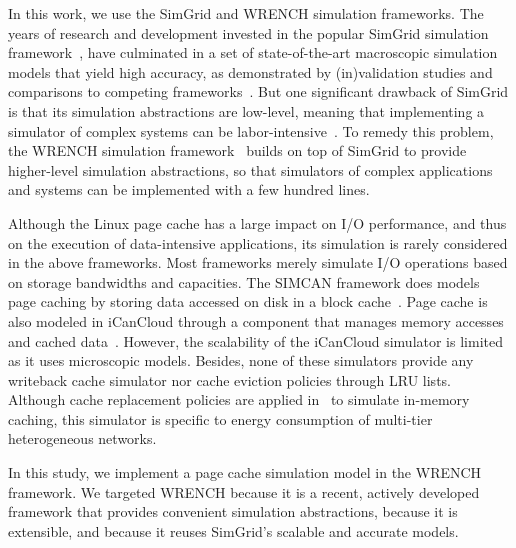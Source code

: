 \documentclass[conference]{IEEEtran}
\newcommand{\simgrid}{SimGrid\xspace}
\newcommand{\wrench}{WRENCH\xspace}
\begin{document}
        In this  work, we use the \simgrid and \wrench simulation
        frameworks.  The years of research and development invested in
        the popular \simgrid simulation framework~\cite{casanova2014simgrid}, have
        culminated in a set of state-of-the-art macroscopic simulation
        models that yield high accuracy, as demonstrated by
        (in)validation studies and comparisons to competing
        frameworks~\cite{smpi_validity, velhoTOMACS2013, simutool_09,
        nstools_07, lebre2015, pouilloux:hal-01197274,
        smpi_tpds2017,  7885814, 8048921, 7384330}.  But one
        significant drawback of \simgrid is that its simulation
        abstractions are low-level, meaning that implementing a
        simulator of complex systems can be
        labor-intensive~\cite{kecskemeti_2014}. To remedy this problem,
        the \wrench simulation framework~\cite{casanova2020fgcs}
        builds on top of \simgrid to provide higher-level simulation
        abstractions, so that simulators of complex applications and
        systems can be implemented with a few hundred lines.

        Although the Linux page cache has a large impact on I/O
        performance, and thus on the execution of data-intensive
        applications, its simulation is rarely considered in the above
        frameworks.  Most frameworks merely simulate I/O operations
        based on storage bandwidths and capacities.  The SIMCAN
        framework does models page caching by storing data accessed on
        disk in a block cache~\cite{nunez2012simcan}.  Page cache is
        also modeled in iCanCloud through a component that manages
        memory accesses and cached data~\cite{nunez2012icancloud}.
        However, the scalability of the iCanCloud simulator is limited
        as it uses microscopic models.  Besides, none
        of these simulators provide any writeback cache simulator nor
        cache eviction policies through LRU lists.  Although cache
        replacement policies are applied in~\cite{xu2018saving} to
        simulate in-memory caching, this simulator is specific to
        energy consumption of multi-tier heterogeneous networks.

        In this study, we implement a page cache simulation model in the
        \wrench framework. We targeted \wrench because it is a recent,
        actively developed framework that provides convenient simulation
        abstractions, because it is extensible, and because it reuses
        \simgrid's scalable and accurate models.
\end{document}
